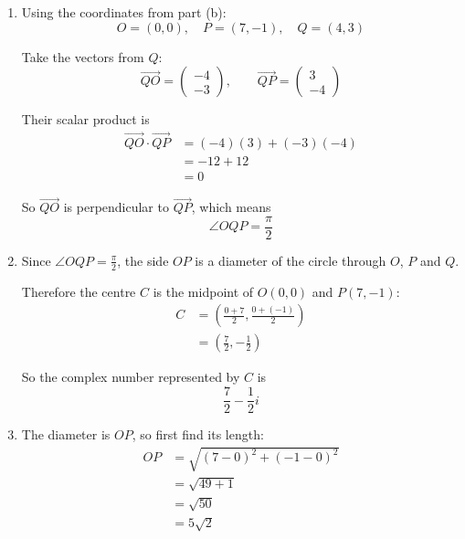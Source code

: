\documentclass[leqno]{article}
\begin{document}
\begin{enumerate}[
  label=\textbf{\arabic*.},
  leftmargin=*,
  topsep=0pt,
  partopsep=0pt,
  parsep=0pt
]
\begin{djsSolution}
\begin{enumerate}[label=\textbf{(\alph*)}]
  \begin{center}
  \end{center}

  \item Using the coordinates from part (b):
  \[
  O=(0,0),\quad P=(7,-1),\quad Q=(4,3)
  \]

  Take the vectors from $Q$:
  \[
  \overrightarrow{QO}=\begin{pmatrix}-4\\-3\end{pmatrix},\qquad \overrightarrow{QP}=\begin{pmatrix}3\\-4\end{pmatrix}
  \]

  Their scalar product is
  \begin{align*}
  \overrightarrow{QO}\cdot\overrightarrow{QP}
  &=(-4)(3)+(-3)(-4)\\
  &=-12+12\\
  &=0
  \end{align*}

  So $\overrightarrow{QO}$ is perpendicular to $\overrightarrow{QP}$, which means
  \[
  \angle OQP=\frac{\pi}{2}
  \]

  \item Since $\angle OQP=\frac{\pi}{2}$, the side $OP$ is a diameter of the circle through $O$, $P$ and $Q$.

  Therefore the centre $C$ is the midpoint of $O(0,0)$ and $P(7,-1)$:
  \begin{align*}
  C&=\left(\frac{0+7}{2},\frac{0+(-1)}{2}\right)\\
   &=\left(\frac72,-\frac12\right)
  \end{align*}

  So the complex number represented by $C$ is
  \[
  \frac72-\frac12i
  \]

  \item The diameter is $OP$, so first find its length:
  \begin{align*}
  OP&=\sqrt{(7-0)^2+(-1-0)^2}\\
    &=\sqrt{49+1}\\
    &=\sqrt{50}\\
    &=5\sqrt2
  \end{align*}


\end{enumerate}
\end{djsSolution}
\end{enumerate}
\end{document}
